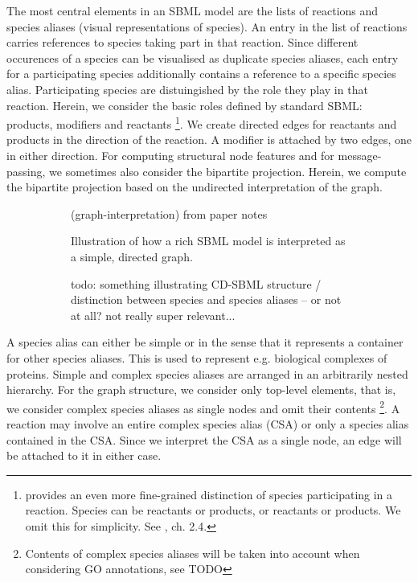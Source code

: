 \documentclass[
	fontsize=10pt, %
	twoside=false, %
	secnumdepth=1, %
  toc=indentunnumbered %
]{kaobook}
\begin{document}
The most central elements in an SBML model are the lists of reactions and
species aliases (visual representations of species). 
%
An entry in the list of reactions carries references to species taking part in
that reaction. Since different occurences of a species can be visualised as
duplicate species aliases, each entry for a participating species additionally
contains a reference to a specific species alias. Participating species are
distuingished by the role they play in that reaction. Herein, we consider the
basic roles defined by standard SBML: products, modifiers and reactants
\footnote{  provides an even more fine-grained
  distinction of species participating in a reaction. Species can be 
  reactants or products,  or  reactants or
  products. We omit this for simplicity. See
  \cite{_CellDesignerExtensionTag_2010}, ch. 2.4.
}. We create directed edges for reactants and products in the
direction of the reaction. A modifier is attached by two edges, one in either
direction. For computing structural node features and for message-passing, we
sometimes also consider the
bipartite projection. Herein, we compute the bipartite projection based on the
undirected interpretation of the graph.

\begin{figure}[h]
  \centering
  \begin{subfigure}{0.45\linewidth}
    (graph-interpretation) from paper notes
    \caption{Illustration of how a rich SBML model is interpreted as a simple,
      directed graph.}
  \end{subfigure}
  \begin{subfigure}{0.45\linewidth}
    todo: something illustrating CD-SBML structure / distinction between species
    and species aliases -- or not at all? not really super relevant...
  \end{subfigure}
  \label{fig:graph-interpretation}
\end{figure}


A species alias can either be simple or  in the sense that it
represents a container for other species aliases. This is used to represent e.g.
biological complexes of proteins. Simple and complex species aliases are
arranged in an arbitrarily nested hierarchy. For the graph structure, we
consider only top-level elements, that is, we consider complex species aliases
as single nodes and omit their contents \footnote{ Contents of complex species
  aliases will be taken into account when considering GO annotations, see TODO
}. A reaction may involve an entire complex species alias (CSA) or only a
species alias contained in the CSA. Since we interpret the CSA as a single node,
an edge will be attached to it in either case.
\end{document}
